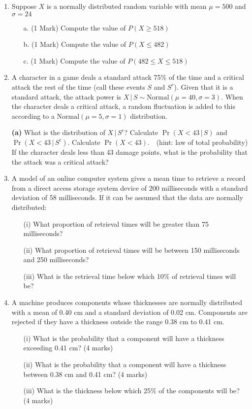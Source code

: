 \documentclass[]{article}
\begin{document}
\begin{enumerate}
\item Suppose $X$ is a normally distributed random variable with mean $\mu =500$ and $\sigma = 24$

\begin{itemize}
	\item[a.] (1 Mark) Compute the value of $P(X \geq 518)$
	\item[b.] (1 Mark) Compute the value of $P(X \leq 482)$
	\item[c.] (1 Mark) Compute the value of $P(482 \leq X \leq 518)$
\end{itemize}
\item 
A character in a game deals a standard attack 75\% of the time and a critical attack the rest of the time (call these events $S$ and $S^c$). Given that it is a standard attack, the attack power is $X\,|\,S \sim \text{Normal}(\mu=40,\sigma=3)$. When the character deals a critical attack, a random fluctuation is added to this according to a $\text{Normal}(\mu=5,\sigma=1)$ distribution.

{\bf(a)} What is the distribution of $X\,|\,S^c$?  Calculate $\Pr(X<43\,|\,S)$ and $\Pr(X<43\,|\,S^c)$.  Calculate $\Pr(X<43)$. \,\, (hint: law of total probability)  If the character deals less than 43 damage points, what is the probability that the attack was a critical attack?

\item 
	
	A model of an online computer system gives a mean time to retrieve a
	record from a direct access storage system device of 200 milliseconds
	with a standard deviation of 58 milliseconds. If it can be assumed that
	the data are normally distributed:
	
	\begin{itemize}
		\item[(i)] What proportion of retrieval times will be greater than 75
		milliseconds?
		\item[(ii)] What proportion of retrieval times will be between 150
		milliseconds and 250 milliseconds?
		\item[(iii)] What is the retrieval time below which 10\% of retrieval times
		will be?
	\end{itemize}


\item 
A machine produces components whose thicknesses are normally
distributed with a mean of 0.40 cm and a standard deviation of 0.02 cm.
Components are rejected if they have a thickness outside the range 0.38 cm
to 0.41 cm.
\begin{itemize}
	\item[(i)] What is the probability that a component will have a thickness
	exceeding 0.41 cm? (4 marks)
	\item[(ii)] What is the probability that a component will have a thickness between
	0.38 cm and 0.41 cm? (4 marks)
	\item[(iii)] What is the thickness below which 25\% of the components will be? (4 marks)
\end{itemize}


\end{enumerate}
\end{document}
